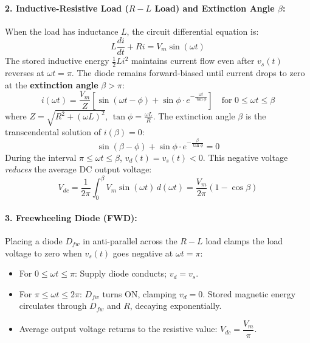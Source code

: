 \paragraph{2. Inductive-Resistive Load ($R-L$ Load) and Extinction Angle $\beta$:}
When the load has inductance $L$, the circuit differential equation is:
\begin{equation}
L \frac{di}{dt} + R i = V_m \sin(\omega t)
\end{equation}
The stored inductive energy $\tfrac{1}{2} L i^2$ maintains current flow even after $v_s(t)$ reverses at $\omega t = \pi$. The diode remains forward-biased until current drops to zero at the \textbf{extinction angle} $\beta > \pi$:
\begin{equation}
i(\omega t) = \frac{V_m}{Z}\left[\sin(\omega t - \phi) + \sin\phi \cdot e^{-\frac{\omega t}{\tan\phi}}\right] \quad \text{for } 0 \le \omega t \le \beta
\end{equation}
where $Z = \sqrt{R^2 + (\omega L)^2}$, $\tan\phi = \frac{\omega L}{R}$. The extinction angle $\beta$ is the transcendental solution of $i(\beta) = 0$:
\begin{equation}
\sin(\beta - \phi) + \sin\phi \cdot e^{-\frac{\beta}{\tan\phi}} = 0
\end{equation}
During the interval $\pi \le \omega t \le \beta$, $v_d(t) = v_s(t) < 0$. This negative voltage \emph{reduces} the average DC output voltage:
\begin{equation}
V_{dc} = \frac{1}{2\pi}\int_0^\beta V_m \sin(\omega t)\,d(\omega t) = \frac{V_m}{2\pi}(1 - \cos\beta)
\end{equation}

\paragraph{3. Freewheeling Diode (FWD):}
Placing a diode $D_{fw}$ in anti-parallel across the $R-L$ load clamps the load voltage to zero when $v_s(t)$ goes negative at $\omega t = \pi$:
\begin{itemize}
  \item For $0 \le \omega t \le \pi$: Supply diode conducts; $v_d = v_s$.
  \item For $\pi \le \omega t \le 2\pi$: $D_{fw}$ turns ON, clamping $v_d = 0$. Stored magnetic energy circulates through $D_{fw}$ and $R$, decaying exponentially.
  \item Average output voltage returns to the resistive value: $V_{dc} = \dfrac{V_m}{\pi}$.
\end{itemize}

